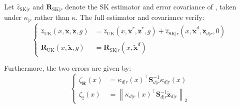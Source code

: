 \begin{proposition}\label{th:errors_residual}
	Let $\hat{z}_{\mathrm{SK}|r}$ and $\mathbf{R}_{\mathrm{SK}|r}$ denote the SK estimator and error covariance of , taken under $\kappa_{|r}$ rather than $\kappa$. The full estimator and covariance verify:
	\begin{equation}
		\left\{\begin{aligned}
		\hat{z}_{\mathrm{UK}}(x,\tilde{\mathbf{x}},\tilde{\mathbf{z}},g)&=\hat{z}_{\mathrm{UK}}(x,\tilde{\mathbf{x}}^r,\tilde{\mathbf{z}}^r,g)+\hat{z}_{\mathrm{SK}|r}(x,\tilde{\mathbf{x}}^d,\tilde{\mathbf{z}}_{d|r},0)\\
		\mathbf{R}_{\mathrm{UK}}(x,\tilde{\mathbf{x}},g)&=\mathbf{R}_{\mathrm{SK}|r}(x,\tilde{\mathbf{x}}^d)
		\end{aligned}\right.
	\end{equation}

	Furthermore, the two errors are given by:
	\begin{equation}
		\left\{\begin{aligned}
		\zeta_{\mathbf{R}}(x)&=\kappa_{d|r}(x)^\top \mathbf{S}_{d|r}^{-1}\kappa_{d|r}(x)\\
		\zeta_{\hat{z}}(x)&=\left\|\kappa_{d|r}(x)^\top \mathbf{S}_{d|r}^{-1}\tilde{\mathbf{z}}_{d|r}\right\|_2
		\end{aligned}\right.
	\end{equation}
\end{proposition}

